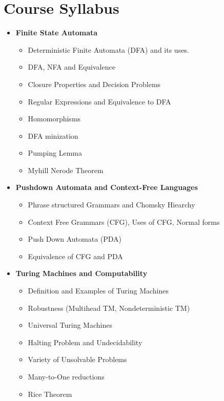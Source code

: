\documentclass{report}
\begin{document}
\section{Course Syllabus}
\begin{itemize}[leftmargin=0.2in]
  \item \textbf{Finite State Automata}
        \begin{itemize}[leftmargin=0.2in]
          \item Deterministic Finite Automata (DFA) and its uses.
          \item DFA, NFA and Equivalence
          \item Closure Properties and Decision Problems
          \item Regular Expressions and Equivalence to DFA
          \item Homomorphisms
          \item DFA minization
          \item Pumping Lemma
          \item Myhill Nerode Theorem
        \end{itemize}
  \item \textbf{Pushdown Automata and Context-Free Languages}
        \begin{itemize}[leftmargin=0.2in]
          \item Phrase structured Grammars and Chomsky Hiearchy
          \item Context Free Grammars (CFG), Uses of CFG, Normal forms
          \item Push Down Automata (PDA)
          \item Equivalence of CFG and PDA
        \end{itemize}
  \item \textbf{Turing Machines and Computability}
        \begin{itemize}[leftmargin=0.2in]
          \item Definition and Examples of Turing Machines
          \item Robustness (Multihead TM, Nondeterministic TM)
          \item Universal Turing Machines
          \item Halting Problem and Undecidability
          \item Variety of Unsolvable Problems
          \item Many-to-One reductions
          \item Rice Theorem
        \end{itemize}
\end{itemize}
\end{document}
